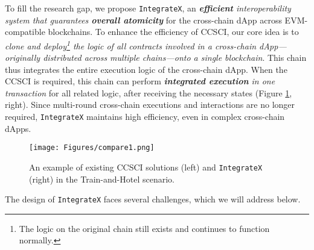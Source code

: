 To fill the research gap, we propose \texttt{IntegrateX}, an \emph{\textbf{efficient} interoperability system that guarantees \textbf{overall atomicity}} for the cross-chain dApp across EVM-compatible blockchains. 
To enhance the efficiency of CCSCI, our core idea is to \emph{clone and deploy\footnote{The logic on the original chain still exists and continues to function normally.} the logic of all contracts involved in a cross-chain dApp—originally distributed across multiple chains—onto a single blockchain}.
This chain thus integrates the entire execution logic of the cross-chain dApp. 
When the CCSCI is required, this chain can perform \emph{\textbf{integrated execution} in one transaction} for all related logic, after receiving the necessary states (Figure \ref{compare}, right). 
Since multi-round cross-chain executions and interactions are no longer required, \texttt{IntegrateX} maintains high efficiency, even in complex cross-chain dApps.

\begin{figure}[t]
    \centering
    \texttt{[image: Figures/compare1.png]}
    \vspace{-18pt}
    \caption{An example of existing CCSCI solutions (left) and \texttt{IntegrateX} (right) in the Train-and-Hotel scenario.}
    \label{compare}
\end{figure} 

The design of \texttt{IntegrateX} faces several challenges, which we will address below.

